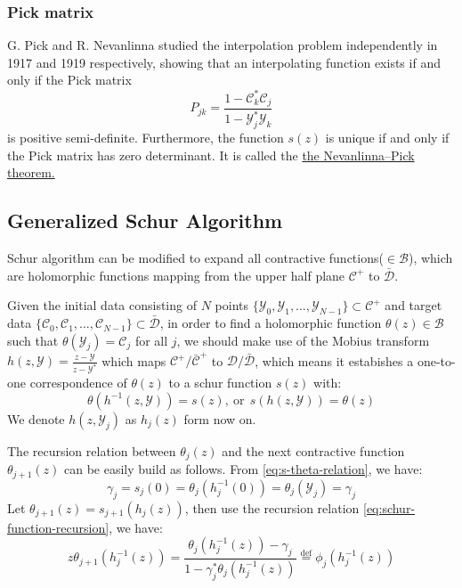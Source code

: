 \documentclass[
	preprint,%
	aps,
	prb,
	showpacs,	
	amsmath, amssymb]{revtex4-2}
\newcommand{\Y}{ {\mathcal{Y}} }
\newcommand{\C}{ {\mathcal{C}} }
\newcommand{\Cbar}{ {\bar{\mathcal{C}}} }
\newcommand{\D}{ {\mathcal{D}} }
\newcommand{\Dbar}{ {\bar{\mathcal{D}}} }
\newcommand{\B}{ {\mathcal{B}} }
\begin{document}
\subsubsection{Pick matrix}
\label{subsubsec:pick-matrix}
G. Pick and R. Nevanlinna studied the interpolation problem 
independently in 1917\cite{Pick1917} and 1919\cite{nevanlinna1919uber} 
respectively, showing that an 
interpolating function exists if and only if the Pick matrix
\begin{equation}\label{eq:pick-matrix-origional}
	P_{jk} = \frac{1-\C_k^* \C_j}{1 - \Y_j^* \Y_k}
\end{equation}
is positive semi-definite. Furthermore, the function $s(z)$ is 
unique if and only if the Pick matrix has zero determinant. It 
is called the 
\href{https://en.wikipedia.org/wiki/Nevanlinna%E2%80%93Pick_interpolation}
	{the Nevanlinna–Pick theorem.}


\subsection{Generalized Schur Algorithm}
\label{subsec:generalized-schur-algorithm}

Schur algorithm can be modified to expand all contractive 
functions($\in \B$)\cite{adamyan2003reconstruction}, which are
holomorphic functions mapping from the upper half plane $\C^+$ 
to $\Dbar$.

Given the initial data consisting of $N$ points 
$\{\Y_0, \Y_1, \dots ,\Y_{N-1}\} \subset \C^+$ and target data
$\{\C_0, \C_1, \dots ,\C_{N-1}\} \subset \Dbar$, 
in order to find a holomorphic function $\theta(z) \in \B$ 
such that $\theta(\Y_j) = \C_j$ for all $j$, we should make use 
of the Mobius transform $h(z, \Y)  = \frac{z - \Y}{z - \Y^*}$ 
which maps $\C^+/\Cbar^+$ to $\D/\Dbar$, 
which means it estabishes a one-to-one correspondence of $\theta(z)$ 
to a schur function $s(z)$ with:
\begin{equation}\label{eq:s-theta-relation}
	\theta(h^{-1}(z,\Y)) = s(z),\ \mathrm{or} \ \
	s(h(z,\Y)) = \theta(z)
\end{equation}
We denote $h(z, \Y_j)$ as $h_j(z)$ form now on.

The recursion relation between $\theta_j(z)$ and the next contractive 
function $\theta_{j+1}(z)$ can be easily build as follows. From 
\cref{eq:s-theta-relation}, we have:
\begin{equation}\label{eq:s-theta-relation-z0}
	\gamma_j = s_j(0) = \theta_j(h_j^{-1}(0)) 
		= \theta_j(\Y_j) = \gamma_j
\end{equation}
Let $\theta_{j+1}(z) = s_{j+1}(h_j(z))$,
then use the recursion relation 
\cref{eq:schur-function-recursion}, we have: 
\begin{equation}\label{eq:schur-function-recursion-theta}
	z\theta_{j+1}(h_j^{-1}(z)) 
	= \frac{\theta_j(h_j^{-1}(z)) 
		- \gamma_j}{1 - \gamma_j^* \theta_j(h_j^{-1}(z))}
	\overset{\mathrm{def}}{=} \phi_j(h_j^{-1}(z))
\end{equation}
\end{document}
